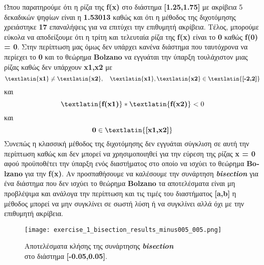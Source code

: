 \documentclass[First Project.tex]{subfiles}
\begin{document}
Ώπου παρατηρούμε ότι η ρίζα της \textlatin{\textbf{f(x)}} στο διάστημα \textlatin{\textbf{[1.25,1.75]}} με ακρίβεια 5 δεκαδικών ψηφίων 
είναι η \textbf{1.53013} καθώς και ότι η μέθοδος της διχοτόμησης χρειάστηκε \textbf{17} επαναλήψεις για να επιτύχει την επιθυμητή ακρίβεια. 
Τέλος, μπορούμε εύκολα να αποδείξουμε ότι η τρίτη και τελευταία ρίζα της \textlatin{\textbf{f(x)}} είναι το \textbf{0} καθώς 
\textlatin{\textbf{f(0) = 0}}. Στην περίπτωση μας όμως δεν υπάρχει κανένα διάστημα που ταυτόχρονα να περίεχει το \textbf{0} και το θεώρημα
\textlatin{\textbf{Bolzano}} να εγγυάται την ύπαρξη τουλάχιστον μιας ρίζας καθώς δεν υπάρχουν \textbf{\textlatin{x1,x2}} με 
\begin{equation*}
    \textlatin{\textbf{x1}} \neq  \textlatin{\textbf{x2}}, \quad \textlatin{\textbf{x1}},\textlatin{\textbf{x2}} \in \textlatin{\textbf{[-2,2]}} 
\end{equation*}
και
\begin{equation*}
    \textlatin{\textbf{f(x1)}} * \textlatin{\textbf{f(x2)}} < 0 
\end{equation*}
και
\begin{equation*}
    \textbf{0} \in  \textlatin{\textbf{[x1,x2]}} 
\end{equation*}
Συνεπώς η κλασσική μέθοδος της διχοτόμησης δεν εγγυάται σύγκλιση σε αυτή την περίπτωση καθώς και δεν μπορεί να χρησιμοποιηθεί για την εύρεση 
της ρίζας \textbf{\textlatin{x = 0}} αφού προϋποθέτει την ύπαρξη ενός διαστήματος στο οποίο να ισχύει το θεώρημα \textlatin{\textbf{Bolzano}} 
για την \textlatin{\textbf{f(x)}}. Αν προσπαθήσουμε να καλέσουμε την συνάρτηση \textit{\textlatin{\textbf{bisection}}} για ένα διάστημα που
δεν ισχύει το θεώρημα \textlatin{\textbf{Bolzano}} τα αποτελέσματα είναι μη προβλέψιμα και ανάλογα την περίπτωση και τις τιμές του 
διαστήματος \textlatin{\textbf{[a,b]}} η μέθοδος μπορεί να μην συγκλίνει σε σωστή λύση ή να συγκλίνει αλλά όχι με την επιθυμητή ακρίβεια.

\begin{figure}[h!]
    \centering
    \captionsetup{justification=centering}
    \begin{center}
        \texttt{[image: exercise\_1\_bisection\_results\_minus005\_005.png]}    
        \caption{ Αποτελέσματα κλήσης της συνάρτησης \textit{\textlatin{\textbf{bisection}}} \\ στο διάστημα \textlatin{\textbf{[-0.05,0.05]}}. }
    \end{center}
\end{figure}
\end{document}
